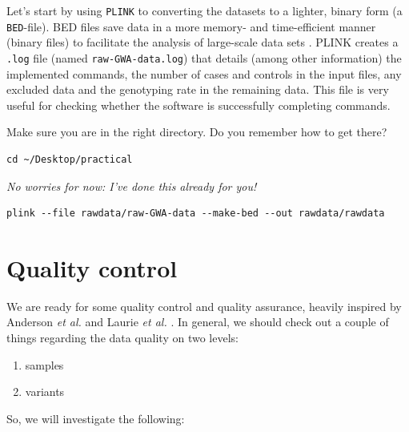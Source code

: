 \documentclass[
]{book}
\newcommand{\passthrough}[1]{#1}
\providecommand{\tightlist}{%
  \setlength{\itemsep}{0pt}\setlength{\parskip}{0pt}}
\begin{document}
Let's start by using \passthrough{\lstinline!PLINK!} to converting the datasets to a lighter, binary form (a \passthrough{\lstinline!BED!}-file). BED files save data in a more memory- and time-efficient manner (binary files) to facilitate the analysis of large-scale data sets \citep{purcell2007}. PLINK creates a \passthrough{\lstinline!.log!} file (named \passthrough{\lstinline!raw-GWA-data.log!}) that details (among other information) the implemented commands, the number of cases and controls in the input files, any excluded data and the genotyping rate in the remaining data. This file is very useful for checking whether the software is successfully completing commands.

Make sure you are in the right directory. Do you remember how to get there?

\begin{lstlisting}
cd ~/Desktop/practical
\end{lstlisting}

\emph{No worries for now: I've done this already for you!}

\begin{lstlisting}
plink --file rawdata/raw-GWA-data --make-bed --out rawdata/rawdata
\end{lstlisting}

\hypertarget{quality-control}{%
\section{Quality control}\label{quality-control}}

We are ready for some quality control and quality assurance, heavily inspired by Anderson \emph{et al.} \citep{anderson2010} and Laurie \emph{et al.} \citep{laurie2010}. In general, we should check out a couple of things regarding the data quality on two levels:

\begin{enumerate}
\def\labelenumi{\arabic{enumi})}
\tightlist
\item
  samples
\item
  variants
\end{enumerate}

So, we will investigate the following:
\end{document}

